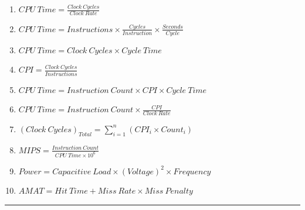 \documentclass{article}
\begin{document}
\begin{enumerate}
\item $CPU\ Time = \frac{Clock\ Cycles}{Clock\ Rate}$
\item $CPU\ Time = Instructions \times \frac{Cycles}{Instruction} \times \frac{Seconds}{Cycle}$
\item $CPU\ Time = Clock\ Cycles \times Cycle\ Time$
\item $CPI = \frac{Clock\ Cycles}{Instructions}$
\item $CPU\ Time = Instruction\ Count \times CPI \times Cycle\ Time$
\item $CPU\ Time = Instruction\ Count \times \frac{CPI}{Clock\ Rate}$
\item $(Clock\ Cycles)_{Total} = \sum_{i = 1}^{n}\left(CPI_{i} \times Count_{i}\right)$
\item $MIPS = \frac{Instruction\ Count}{CPU\ Time \times 10^{6}}$
\item $Power = Capacitive\ Load \times (Voltage)^{2} \times Frequency$
\item $AMAT = Hit\ Time + Miss\ Rate \times Miss\ Penalty$
\end{enumerate}
\hrule
\end{document}
